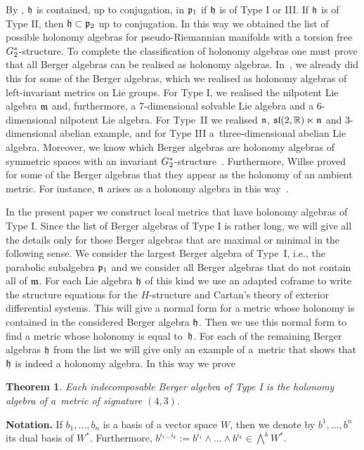 \documentclass[11pt]{article}
\numberwithin{equation}{section}
\newtheorem{Theorem}{Theorem}[section]
\newcommand\fh{{\frak h}}
\newcommand\fm{{\frak m}}
\newcommand\fn{{\frak n}}
\newcommand{\G}{\mathop{{{\rm G}_{2}^*}}}
\begin{document}
By \cite{FK}, $\frak h$ is contained, up to conjugation, in $\frak p_1$ if $\frak h$ is of Type I or III. If $\frak h$ is of Type II, then $\frak h \subset \frak p_2$ up to conjugation. In this way we obtained the list of possible holonomy algebras for pseudo-Riemannian manifolds with a torsion free $\G$-structure. To complete the classification of holonomy algebras one must prove that all Berger algebras can be realised as holonomy algebras. In~\cite{FK}, we already did this for some of the Berger algebras, which we realised as holonomy algebras of left-invariant metrics on Lie groups. For Type I, we realised the nilpotent Lie algebra $\frak m$ and, furthermore, a 7-dimensional solvable Lie algebra and a 6-dimensional nilpotent Lie algebra. For Type~II we realised $\frak n$, ${\frak {sl}}(2, \mathbb R) \ltimes \frak n$ and 3-dimensional abelian example, and for Type III a~three-dimensional abelian Lie algebra. Moreover, we know which Berger algebras are holonomy algebras of symmetric spaces with an invariant $\G$-structure~\cite{FK, K}. Furthermore, Willse proved for some of the Berger algebras that they appear as the holonomy of an ambient metric. For instance, $\fn$ arises as a holonomy algebra in this way~\cite{W}.

In the present paper we construct local metrics that have holonomy algebras of Type I. Since the list of Berger algebras of Type I is rather long, we will give all the details only for those Berger algebras that are maximal or minimal in the following sense. We consider the largest Berger algebra of Type~I, i.e., the parabolic subalgebra $\frak p_1$ and we consider all Berger algebras that do not contain all of $\fm$. For each Lie algebra $\fh$ of this kind we use an adapted coframe to write the structure equations for the $H$-structure and Cartan's theory of exterior differential systems. This will give a normal form for a metric whose holonomy is contained in the considered Berger algebra $\fh$. Then we use this normal form to find a metric whose holonomy is equal to~$\fh$. For each of the remaining Berger algebras $\fh$ from the list we will give only an example of a~metric that shows that $\fh$ is indeed a holonomy algebra. In this way we prove
\begin{Theorem}\label{T}
Each indecomposable Berger algebra of Type I is the holonomy algebra of a~metric of signature $(4,3)$.
\end{Theorem}

\noindent
{\bf Notation.} If $b_1,\dots,b_n$ is a basis of a vector space $W$, then we denote by $b^1,\dots,b^n$ its dual basis of $W^*$. Furthermore, $b^{i_1\dots i_k}:=b^{i_1}\wedge\dots\wedge b^{i_k}\in\bigwedge^k W^*$.
\end{document}
